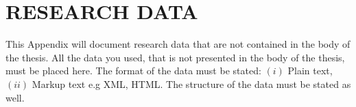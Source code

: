 \chapter{\large RESEARCH DATA}

This Appendix will document research data that are not contained in the body of the thesis. All the data you used, that is not presented in the body of the thesis, must be placed here. The format of the data must be stated: $(i)$ Plain text, $(ii)$ Markup text e.g XML, HTML. The structure of the data must be stated as well. 
